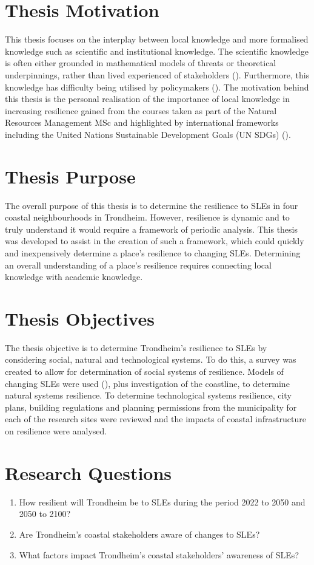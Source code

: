 \section{Thesis Motivation}
 This thesis focuses on the interplay between local knowledge and more formalised knowledge such as scientific and institutional knowledge. The scientific knowledge is often either grounded in mathematical models of threats or theoretical underpinnings, rather than lived experienced of stakeholders (\cite{gerkensmeier_governing_2018}). Furthermore, this knowledge has difficulty being utilised by policymakers (\cite{gerkensmeier_governing_2018}). The motivation behind this thesis is the personal realisation of the importance of local knowledge in increasing resilience gained from the courses taken as part of the Natural Resources Management MSc and highlighted by international frameworks including the United Nations Sustainable Development Goals (UN SDGs) (\cite{un_sustainable_2021}).  

\section{Thesis Purpose}
The overall purpose of this thesis is to determine the resilience to SLEs in four coastal neighbourhoods in Trondheim. However, resilience is dynamic and to truly understand it would require a framework of periodic analysis. This thesis was developed to assist in the creation of such a framework, which could quickly and inexpensively determine a place's resilience to changing SLEs. Determining an overall understanding of a place's resilience requires connecting local knowledge with academic knowledge.  


\section{Thesis Objectives}
The thesis objective is to determine Trondheim's resilience to SLEs by considering social, natural and technological systems. To do this, a survey was created to allow for determination of social systems of resilience.  Models of changing SLEs were used (\cite{kartverket_se_2021}), plus investigation of the coastline, to determine natural systems resilience. To determine technological systems resilience, city plans, building regulations and planning permissions from the municipality for each of the research sites were reviewed and the impacts of coastal infrastructure on resilience were analysed.

\section{Research Questions}
\begin{enumerate}
    \item How resilient will Trondheim be to SLEs during the period 2022 to 2050 and 2050 to 2100?
    \item Are Trondheim's coastal stakeholders aware of changes to SLEs?
    \item What factors impact  Trondheim's coastal stakeholders’ awareness of SLEs?
\end{enumerate}


